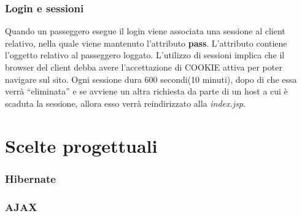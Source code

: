 \documentclass[a4paper,10pt]{article}
\begin{document}
\section{Login e sessioni}
Quando un passeggero esegue il login viene associata una sessione al client relativo, nella quale viene mantenuto
l'attributo \textbf{pass}. L'attributo contiene l'oggetto relativo al passeggero loggato.
L'utilizzo di sessioni implica che il browser del client debba avere l'accettazione 
di COOKIE attiva per poter navigare sul sito.
Ogni sessione dura 600 secondi(10 minuti), dopo di che  essa verr\`a ``eliminata'' e se 
avviene   un   altra   richiesta   da   parte   di   un   host   a   cui   \`e   scaduta   la   sessione,   allora   esso   verr\`a 
reindirizzato alla \textit{index.jsp}.

\part{Scelte progettuali}

\section{Hibernate}
\section{AJAX}
\end{document}
